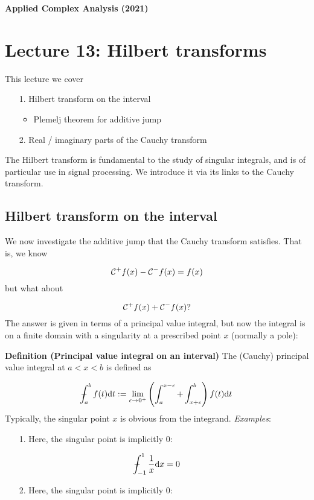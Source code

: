 \documentclass[12pt,landscape]{article}
\def\D{ {\rm d} }
\def\CC{ {\cal C} }
\def\Xint#1{ \mathchoice
   {\XXint\displaystyle\textstyle{#1} }%
   {\XXint\textstyle\scriptstyle{#1} }%
   {\XXint\scriptstyle\scriptscriptstyle{#1} }%
   {\XXint\scriptscriptstyle\scriptscriptstyle{#1} }%
   \!\int}
\def\XXint#1#2#3{ {\setbox0=\hbox{$#1{#2#3}{\int}$}
     \vcenter{\hbox{$#2#3$}}\kern-.5\wd0} }
\def\dashint{\Xint-}
\def\dx{\D x}
\def\dt{\D t}
\begin{document}
{\LARGE
\sf
\textbf{Applied Complex Analysis (2021)}

\section{Lecture 13: Hilbert transforms}
This lecture we cover

\begin{itemize}
\item[1. ] Hilbert transform on the interval

\begin{itemize}
\item Plemelj theorem for additive jump

\end{itemize}

\item[2. ] Real / imaginary parts of the Cauchy transform

\end{itemize}
The Hilbert transform is fundamental to the study of singular integrals, and is of particular use in signal processing. We introduce it via its links to the Cauchy transform.
\newpage
\subsection{Hilbert transform on the interval}
We now investigate the additive jump that the Cauchy transform satisfies. That is, we know

\[
    \CC^+ f(x) - \CC^- f(x) = f(x)
\]
but what about

\[
    \CC^+ f(x) + \CC^- f(x)?
\]
The answer is given in terms of a principal value integral, but now the integral is on a finite domain with a singularity at a prescribed point $x$ (normally a pole):

\textbf{Definition (Principal value integral on an interval)} The (Cauchy) principal value integral at $a < x < b$ is defined as

\[
\dashint_a^b f(t) \dt := \lim_{\epsilon \rightarrow 0^+} \left(\int_a^{x - \epsilon} + \int_{x + \epsilon}^b \right) f(t) \dt
\]
Typically, the singular point $x$ is obvious from the integrand.
\newpage
\emph{Examples}:

\begin{itemize}
\item[1. ] Here, the singular point is implicitly 0:

\end{itemize}
\[
\dashint_{-1}^1  {1 \over x} \dx = 0
\]
\begin{itemize}
\item[2. ] Here, the singular point is implicitly 0:


\end{itemize}}
\end{document}
